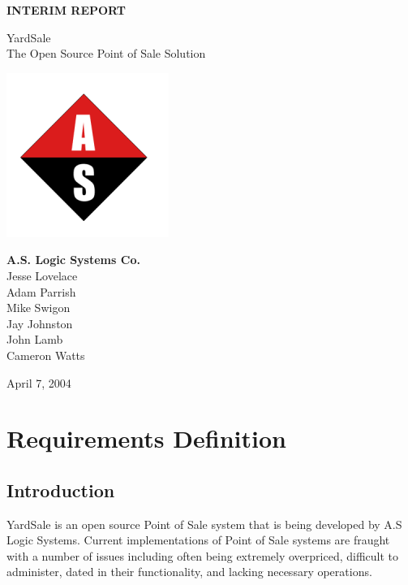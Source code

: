 \documentclass{report}
\begin{document}
\begin{titlepage}
    \vspace*{2cm}
    \begin{center}

        {\LARGE {\bf INTERIM REPORT}}\\
        \vspace*{1cm}

        \LARGE{ YardSale\\The Open Source Point of Sale Solution\\ }

        \includegraphics{aslogic_smaller.png}

        \large{{\bf A.S. Logic Systems Co.}\\Jesse Lovelace\\Adam
        Parrish\\Mike Swigon\\Jay Johnston\\John Lamb\\Cameron Watts\\}
        \vspace*{0.5cm}

        {April 7, 2004}
    \end{center}
\end{titlepage}

\tableofcontents

\chapter{Requirements Definition}

    \section{Introduction}

        YardSale is an open source Point of Sale system that is being
        developed by A.S Logic Systems.  Current
        implementations of Point of Sale systems are fraught with a number
        of issues including often being extremely overpriced, difficult
        to administer, dated in their functionality, and lacking necessary
        operations.
\end{document}
